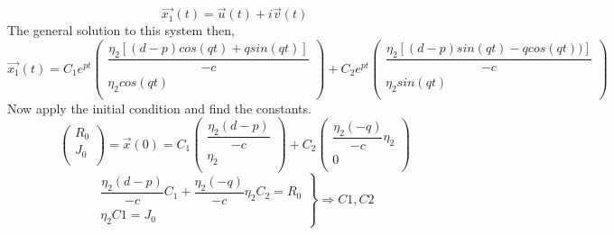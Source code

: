 \documentclass[a4paper]{article}
\begin{document}
    \begin{equation*}
        \vec{x_1}(t)=\vec{u}(t) + i\vec{v}(t)
    \end{equation*}
    The general solution to this system then,
    \begin{equation}
        \vec{x_1}(t)=
            C_1 e^{pt}
            \begin{pmatrix}
                \dfrac{\eta_2[(d - p)cos(qt) + q sin(qt)]}{-c} \\
                \eta_2 cos(qt) \\
            \end{pmatrix}
            +
            C_2 e^{pt}
            \begin{pmatrix}
                \dfrac{\eta_2[(d - p) sin(qt) - q cos(qt) )]}{-c} \\
                \eta_2 sin(qt) \\
            \end{pmatrix}\label{eq:equation5}
    \end{equation}
    Now apply the initial condition and find the constants.
    \begin{equation*}
        \begin{pmatrix}
            R_0 \\
            J_0 \\
        \end{pmatrix}
        =
        \vec{x}(0)
        =
            {C_1}
            \begin{pmatrix}
                \dfrac{\eta_2 (d - p)}{-c} \\
                \eta_2 \\
            \end{pmatrix}
        +
            {C_2}
            \begin{pmatrix}
                \dfrac{\eta_2 (-q)}{-c}\eta_2 \\
                0 \\
            \end{pmatrix}
    \end{equation*}
    \begin{equation*}
        \left.
        \begin{array}{ll}
            \dfrac{\eta_2 (d - p)}{-c} C_1 + \dfrac{\eta_2 (-q)}{-c}\eta_2 C_2 = R_0\\
            \eta_2 C1 = J_0
        \end{array}
        \right \} \Rightarrow C1, C2
    \end{equation*}
\end{document}

